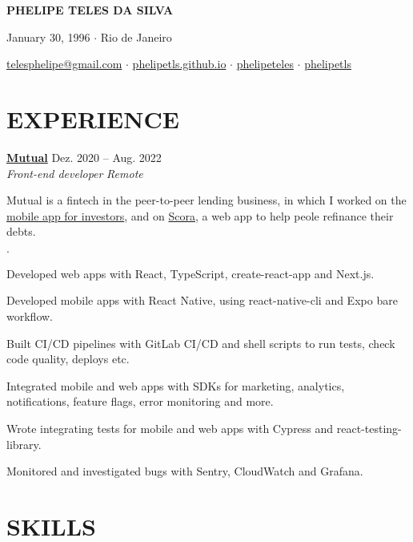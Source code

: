 \documentclass[12pt]{article}
\newenvironment{tightlist}
  {\begin{list}
    {$\cdot$}
    {
      \setlength{\leftmargin}{0em}
      \setlength{\itemsep}{\smallskipamount}
    }
  }
{\end{list}}
\begin{document}
\pagestyle{empty}

\centerline{\huge\bf PHELIPE TELES DA SILVA}
\medskip

\centerline{January 30, 1996 $\cdot$ Rio de Janeiro}
\smallskip

\centerline{
  \href{mailto:telesphelipe@gmail.com}{ telesphelipe@gmail.com}
  $\cdot$
  \href{https://phelipetls.github.io}{ phelipetls.github.io}
  $\cdot$
  \href{https://linkedin.com/in/phelipeteles}{ phelipeteles}
  $\cdot$
  \href{https://github.com/phelipetls/}{ phelipetls}
}
\smallskip

\section*{EXPERIENCE}

\textbf{\href{https://mutual.club}{Mutual}} \hfill Dez. 2020 -- Aug. 2022 \\
\textit{Front-end developer} \hfill \textit{Remote} {\parfillskip=0pt\par}

Mutual is a fintech in the peer-to-peer lending business, in which I worked on
the \href{https://mutual.club/en/invest.html}{mobile app for investors}, and on
\href{https://scora.com.br/}{Scora}, a web app to help peole refinance their
debts.

\begin{tightlist}
  \item Developed web apps with React, TypeScript, create-react-app and Next.js.
  \item Developed mobile apps with React Native, using react-native-cli and Expo
    bare workflow.
  \item Built CI/CD pipelines with GitLab CI/CD and shell scripts to run tests,
    check code quality, deploys etc.
  \item Integrated mobile and web apps with SDKs for marketing, analytics,
    notifications, feature flags, error monitoring and more.
  \item Wrote integrating tests for mobile and web apps with Cypress and
    react-testing-library.
  \item Monitored and investigated bugs with Sentry, CloudWatch and Grafana.
\end{tightlist}

\section*{SKILLS}
\end{document}
